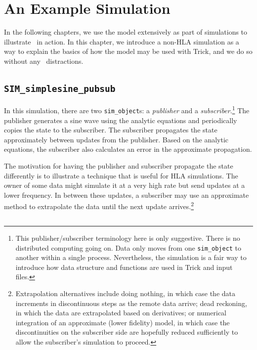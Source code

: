\chapter{An Example \simplesine Simulation}
\label{sec:simplesine-sim}

In the following chapters,
we use the \simplesine model extensively as part of simulations
to illustrate \TrickHLA\ in action.
In this chapter, we introduce a non-HLA \simplesine simulation
as a way to explain the basics of how the model may be used with Trick,
and we do so without any \TrickHLA\ distractions.

\section{\tt SIM\_simplesine\_pubsub}

In this simulation, there are two {\tt sim\_object}s:
a {\em publisher} and a {\em subscriber}.\footnote{
This publisher/subscriber terminology here is only suggestive.
There is no distributed computing going on.
Data only moves from one {\tt sim\_object} to another within a single process.
Nevertheless, the simulation is a fair way to introduce how \simplesine
data structure and functions are used in Trick \sdefine and input files.
}
The publisher generates a sine wave using the analytic equations
and periodically copies the state to the subscriber.
The subscriber propagates the state approximately between updates from
the publisher.
Based on the analytic equations, the subscriber also calculates an error
in the approximate propagation.

The motivation for having the publisher and subscriber propagate the state
differently is to illustrate a technique that is useful for HLA simulations.
The owner of some data might simulate it at a very high rate but
send updates at a lower frequency.
In between these updates, a subscriber may use an approximate method to
extrapolate the data until the next update arrives.\footnote{
  Extrapolation alternatives include doing nothing, in which case the
  data increments in discontinuous steps as the remote data arrive;
  dead reckoning, in which the data are extrapolated based on derivatives;
  or numerical integration of an approximate (lower fidelity) model, in
  which case the discontinuities on the subscriber side are hopefully
  reduced sufficiently to allow the subscriber's simulation to proceed.
}
\section{\sdefine}
\label{sec:simplesine-pubsub-sdefine}

